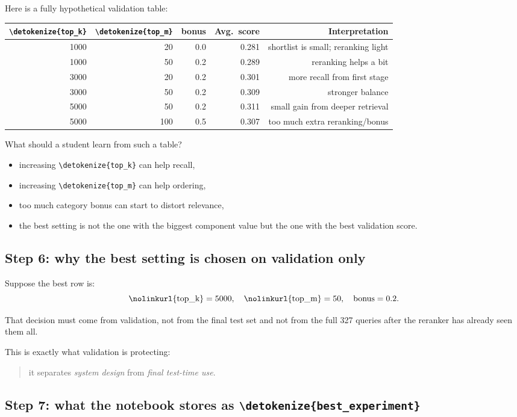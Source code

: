 \documentclass[10pt]{article}
\DeclareRobustCommand{\code}[1]{%
  \ifmmode
    \text{\nolinkurl{\detokenize{#1}}}%
  \else
    \nolinkurl{\detokenize{#1}}%
  \fi
}
\begin{document}
Here is a fully hypothetical validation table:
\begin{center}
\begin{tabular}{@{}rrrrr@{}}
\toprule
\code{top_k} & \code{top_m} & bonus & Avg.\ score & Interpretation \\
\midrule
1000 & 20 & 0.0 & 0.281 & shortlist is small; reranking light \\
1000 & 50 & 0.2 & 0.289 & reranking helps a bit \\
3000 & 20 & 0.2 & 0.301 & more recall from first stage \\
3000 & 50 & 0.2 & 0.309 & stronger balance \\
5000 & 50 & 0.2 & 0.311 & small gain from deeper retrieval \\
5000 & 100 & 0.5 & 0.307 & too much extra reranking/bonus \\
\bottomrule
\end{tabular}
\end{center}

What should a student learn from such a table?
\begin{itemize}
    \item increasing \code{top_k} can help recall,
    \item increasing \code{top_m} can help ordering,
    \item too much category bonus can start to distort relevance,
    \item the best setting is not the one with the biggest component value but the one with the best validation score.
\end{itemize}

\subsection*{Step 6: why the best setting is chosen on validation only}

Suppose the best row is:
\[
\code{top_k}=5000,\quad \code{top_m}=50,\quad \text{bonus}=0.2.
\]

That decision must come from validation, not from the final test set and not from the full 327 queries after the reranker has already seen them all.

This is exactly what validation is protecting:
\begin{quote}
it separates \emph{system design} from \emph{final test-time use}.
\end{quote}

\subsection*{Step 7: what the notebook stores as \code{best\_experiment}}
\end{document}
